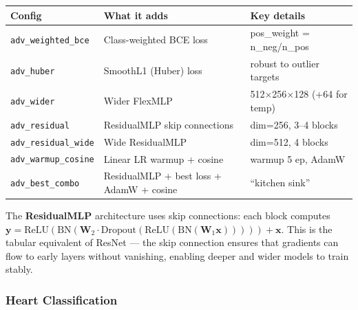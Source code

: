 \documentclass[11pt,a4paper]{article}
\begin{document}
\begin{center}
\small
\begin{tabular}{lll}
\toprule
\textbf{Config} & \textbf{What it adds} & \textbf{Key details} \\
\midrule
\texttt{adv\_weighted\_bce} & Class-weighted BCE loss & pos\_weight = n\_neg/n\_pos \\
\texttt{adv\_huber}         & SmoothL1 (Huber) loss   & robust to outlier targets \\
\texttt{adv\_wider}         & Wider FlexMLP           & 512$\times$256$\times$128 (+64 for temp) \\
\texttt{adv\_residual}      & ResidualMLP skip connections & dim=256, 3--4 blocks \\
\texttt{adv\_residual\_wide}& Wide ResidualMLP        & dim=512, 4 blocks \\
\texttt{adv\_warmup\_cosine}& Linear LR warmup + cosine & warmup 5 ep, AdamW \\
\texttt{adv\_best\_combo}   & ResidualMLP + best loss + AdamW + cosine & ``kitchen sink'' \\
\bottomrule
\end{tabular}
\end{center}

The \textbf{ResidualMLP} architecture uses skip connections: each block computes
$\mathbf{y} = \mathrm{ReLU}(\mathrm{BN}(\mathbf{W}_2 \cdot \mathrm{Dropout}(\mathrm{ReLU}(\mathrm{BN}(\mathbf{W}_1 \mathbf{x}))))) + \mathbf{x}$.
This is the tabular equivalent of ResNet --- the skip connection ensures that gradients can flow to early layers without vanishing, enabling deeper and wider models to train stably.

\subsubsection*{Heart Classification}
\end{document}
